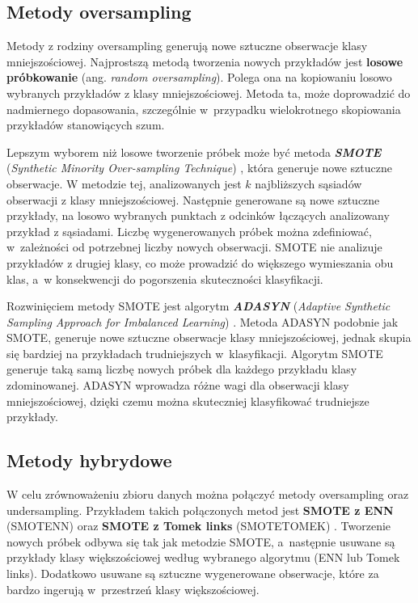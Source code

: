 \subsection{Metody oversampling}
Metody z rodziny oversampling generują nowe sztuczne obserwacje klasy mniejszościowej. Najprostszą metodą tworzenia nowych przykładów jest \textbf{losowe próbkowanie} (ang. \textit{random oversampling}). Polega ona na kopiowaniu losowo wybranych przykładów z klasy mniejszościowej. Metoda ta, może doprowadzić do nadmiernego dopasowania, szczególnie w~przypadku wielokrotnego skopiowania przykładów stanowiących szum. \par
Lepszym wyborem niż losowe tworzenie próbek może być metoda \textbf{\textit{SMOTE}} (\textit{Synthetic Minority Over-sampling Technique}) \cite{smotec}, która generuje nowe sztuczne obserwacje. W metodzie tej, analizowanych jest $k$ najbliższych sąsiadów obserwacji z klasy mniejszościowej. Następnie generowane są nowe sztuczne przykłady, na losowo wybranych punktach z odcinków łączących analizowany przykład z sąsiadami. Liczbę wygenerowanych próbek można zdefiniować, w~zależności od potrzebnej liczby nowych obserwacji. SMOTE nie analizuje przykładów z drugiej klasy, co może prowadzić do większego wymieszania obu klas, a~w konsekwencji do pogorszenia skuteczności klasyfikacji. \par
Rozwinięciem metody SMOTE jest algorytm \textbf{\textit{ADASYN}} (\textit{Adaptive Synthetic Sampling Approach for Imbalanced Learning}) \cite{adasync}. Metoda ADASYN podobnie jak SMOTE, generuje nowe sztuczne obserwacje klasy mniejszościowej, jednak skupia się bardziej na przykładach trudniejszych w~klasyfikacji. Algorytm SMOTE generuje taką samą liczbę nowych próbek dla każdego przykładu klasy zdominowanej. ADASYN wprowadza różne wagi dla obserwacji klasy mniejszościowej, dzięki czemu można skuteczniej klasyfikować trudniejsze przykłady.
\subsection{Metody hybrydowe}
W celu zrównoważeniu zbioru danych można połączyć metody oversampling oraz undersampling. Przykładem takich połączonych metod jest \textbf{SMOTE z ENN} (SMOTENN) oraz \textbf{SMOTE z Tomek links} (SMOTETOMEK) \cite{hybrid}. Tworzenie nowych próbek odbywa się tak jak metodzie SMOTE, a~następnie usuwane są przykłady klasy większościowej według wybranego algorytmu (ENN lub Tomek links). Dodatkowo usuwane są sztuczne wygenerowane obserwacje, które za bardzo ingerują w~przestrzeń klasy większościowej.
